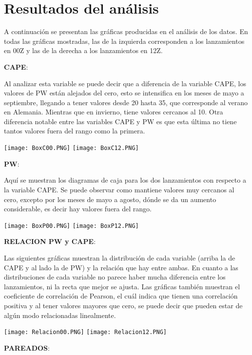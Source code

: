 \documentclass{article}
\begin{document}
\section{Resultados del análisis}
A continuación se presentan las gráficas producidas en el análisis de los datos. En todas las gráficas mostradas, las de la izquierda corresponden a los lanzamientos en 00Z y las de la derecha a los lanzamientos en 12Z.
 
\textbf{CAPE}:

Al analizar esta variable se puede decir que a diferencia de la variable CAPE, los valores de PW están alejados del cero, esto se intensifica en los meses de mayo a septiembre, llegando a tener valores desde 20 hasta 35, que corresponde al verano en Alemania. Mientras que en invierno, tiene valores cercanos al 10. Otra diferencia notable entre las variables CAPE y PW es que esta última no tiene tantos valores fuera del rango como la primera.
\begin{center}
    \texttt{[image: BoxC00.PNG]}
    \texttt{[image: BoxC12.PNG]}
\end{center}

\textbf{PW}:

Aquí se muestran los diagramas de caja para los dos lanzamientos con respecto a la variable CAPE. Se puede observar como mantiene valores muy cercanos al cero, excepto por los meses de mayo a agosto, dónde se da un aumento considerable, es decir hay valores fuera del rango.
\begin{center}
    \texttt{[image: BoxP00.PNG]}
    \texttt{[image: BoxP12.PNG]}
\end{center}


\textbf{RELACION PW y CAPE}:

Las siguientes gráficas muestran la distribución de cada variable (arriba la de CAPE y al lado la de PW) y la relación que hay entre ambas. En cuanto a las distribuciones de cada variable no parece haber mucha diferencia entre los lanzamientos, ni la recta que mejor se ajusta. Las gráficas también muestran el coeficiente de correlación de Pearson, el cuál indica que tienen una correlación positiva y al tener valores mayores que cero, se puede decir que pueden estar de algún modo relacionadas linealmente.
\begin{center}
    \texttt{[image: Relacion00.PNG]}
    \texttt{[image: Relacion12.PNG]}
\end{center}
\textbf{PAREADOS}:
\end{document}

